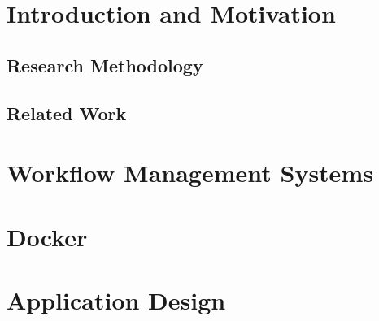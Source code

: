 \documentclass[language=english,noinputenc]{wiwwuwordrprt}
\begin{document}
  \EinfTitelseite

  \tableofcontents
  \listoffigures
  \listoftables

  
  

  \clearpage
  


  \chapter{Introduction and Motivation} %
  \label{cha:introduction_and_motivation}

    \section{Research Methodology} %
      \label{sec:research_methodology}
      

    \section{Related Work} %
      \label{sec:related_work}
      
  

  \chapter{Workflow Management Systems} %
    \label{cha:workflow_management_systems}
    

  \chapter{Docker} %
    \label{cha:docker}
      

  \chapter{Application Design} %
    \label{cha:solution_design}
\end{document}
